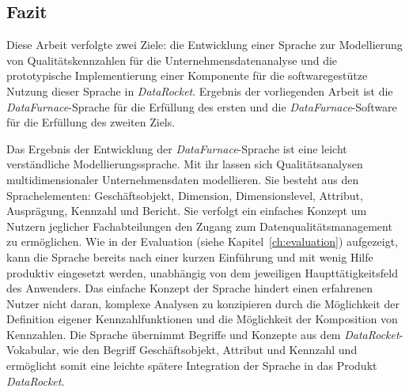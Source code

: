 \documentclass[
  language=german, %
  type=bachelor,%
  ngerman
]{isthesis}
\begin{document}
\begin{content}

\chapter{Fazit}\label{ch:fazit}

Diese Arbeit verfolgte zwei Ziele: die Entwicklung einer Sprache zur
Modellierung von Qualitätskennzahlen für die Unternehmensdatenanalyse und die
prototypische Implementierung einer Komponente für die softwaregestütze Nutzung
dieser Sprache in \textit{DataRocket}. Ergebnis der vorliegenden Arbeit ist die
\textit{DataFurnace}-Sprache für die Erfüllung des ersten und die
\textit{DataFurnace}-Software für die Erfüllung des zweiten Ziels.

Das Ergebnis der Entwicklung der \textit{DataFurnace}-Sprache ist eine leicht
verständliche Modellierungssprache. Mit ihr lassen sich Qualitätsanalysen
multidimensionaler Unternehmensdaten modellieren. Sie besteht aus den
Sprachelementen: Geschäftsobjekt, Dimension, Dimensionslevel, Attribut,
Ausprägung, Kennzahl und Bericht. Sie verfolgt ein einfaches Konzept um Nutzern
jeglicher Fachabteilungen den Zugang zum Datenqualitätsmanagement zu
ermöglichen. Wie in der Evaluation (siehe Kapitel~\ref{ch:evaluation})
aufgezeigt, kann die Sprache bereits nach einer kurzen Einführung und mit wenig
Hilfe produktiv eingesetzt werden, unabhängig von dem jeweiligen
Haupttätigkeitsfeld des Anwenders. Das einfache Konzept der Sprache hindert
einen erfahrenen Nutzer nicht daran, komplexe Analysen zu konzipieren durch die
Möglichkeit der Definition eigener Kennzahlfunktionen und die Möglichkeit der
Komposition von Kennzahlen. Die Sprache übernimmt Begriffe
und Konzepte aus dem \textit{DataRocket}-Vokabular, wie \zB{} den Begriff
Geschäftsobjekt, Attribut und Kennzahl und ermöglicht somit eine leichte
spätere Integration der Sprache in das Produkt \textit{DataRocket}.


\end{content}
\end{document}
